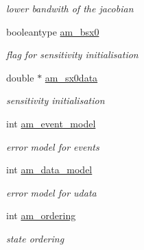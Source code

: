 \begin{DoxyCompactItemize}
\begin{DoxyCompactList}\small\item\em lower bandwith of the jacobian \end{DoxyCompactList}\item 
booleantype \hyperlink{struct_user_data_a87d2f917b1bea7fea2d5878ccd43c7db}{am\+\_\+bsx0}
\begin{DoxyCompactList}\small\item\em flag for sensitivity initialisation \end{DoxyCompactList}\item 
\hypertarget{struct_user_data_a7ac27602345668b3a2bcabac4c7af733}{}double $\ast$ \hyperlink{struct_user_data_a7ac27602345668b3a2bcabac4c7af733}{am\+\_\+sx0data}\label{struct_user_data_a7ac27602345668b3a2bcabac4c7af733}

\begin{DoxyCompactList}\small\item\em sensitivity initialisation \end{DoxyCompactList}\item 
\hypertarget{struct_user_data_ace3cae0f78a3365a5fac7d7daa9928ff}{}int \hyperlink{struct_user_data_ace3cae0f78a3365a5fac7d7daa9928ff}{am\+\_\+event\+\_\+model}\label{struct_user_data_ace3cae0f78a3365a5fac7d7daa9928ff}

\begin{DoxyCompactList}\small\item\em error model for events \end{DoxyCompactList}\item 
\hypertarget{struct_user_data_a83373144a2adb9f97cdfca2dfc79ce80}{}int \hyperlink{struct_user_data_a83373144a2adb9f97cdfca2dfc79ce80}{am\+\_\+data\+\_\+model}\label{struct_user_data_a83373144a2adb9f97cdfca2dfc79ce80}

\begin{DoxyCompactList}\small\item\em error model for udata \end{DoxyCompactList}\item 
\hypertarget{struct_user_data_a260a14e35469f1516b194f4f065a9794}{}int \hyperlink{struct_user_data_a260a14e35469f1516b194f4f065a9794}{am\+\_\+ordering}\label{struct_user_data_a260a14e35469f1516b194f4f065a9794}

\begin{DoxyCompactList}\small\item\em state ordering \end{DoxyCompactList}\end{DoxyCompactItemize}



